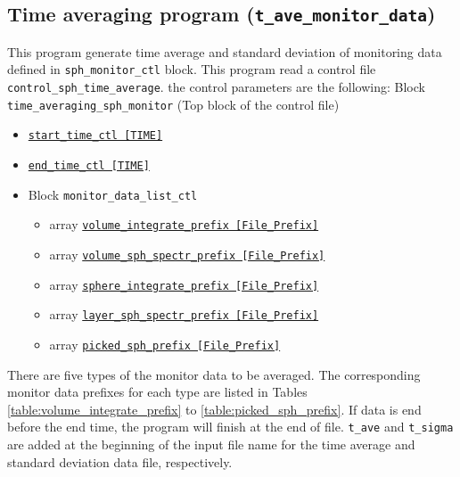 \subsection{Time averaging program  ({\tt t\_ave\_monitor\_data})}
\label{sec:ave_mean_square}
This program generate time average and standard deviation of monitoring data defined in {\tt sph\_monitor\_ctl} block. This program read a control file {\tt control\_sph\_time\_average}. the control parameters are the following:
%
Block \verb|time_averaging_sph_monitor|  (Top block of the control file)
\label{href_i:time_averaging_sph_monitor}
%
\begin{itemize}
\item \hyperref[href_t:tave_start_time_ctl]
		{\tt start\_time\_ctl    [TIME]}
\item \hyperref[href_t:tave_end_time_ctl]
		{\tt end\_time\_ctl      [TIME]}
\item Block {\tt monitor\_data\_list\_ctl}
				\label{href_i:data_files_def}
	\begin{itemize}
	\item array \hyperref[href_t:volume_integrate_prefix]
				{\tt volume\_integrate\_prefix    [File\_Prefix]}
				\label{href_i:volume_integrate_prefix}
	\item array \hyperref[href_t:volume_sph_spectr_prefix]
				{\tt volume\_sph\_spectr\_prefix   [File\_Prefix]}
				\label{href_i:volume_sph_spectr_prefix}
	\item array \hyperref[href_t:sphere_integrate_prefix]
				{\tt sphere\_integrate\_prefix     [File\_Prefix]}
				\label{href_i:sphere_integrate_prefix}
	\item array \hyperref[href_t:layer_sph_spectr_prefix]
				{\tt layer\_sph\_spectr\_prefix    [File\_Prefix]}
				\label{href_i:layer_sph_spectr_prefix}
	\item array \hyperref[href_t:picked_sph_prefix]
				{\tt picked\_sph\_prefix           [File\_Prefix]}
				\label{href_i:picked_sph_prefix}
	\end{itemize}
%
\end{itemize}
%
There are five types of the monitor data to be averaged. The corresponding monitor data prefixes for each type are listed in Tables \ref{table:volume_integrate_prefix} to \ref{table:picked_sph_prefix}. If data is end before the end time, the program will finish at the end of file. \verb|t_ave| and \verb|t_sigma| are added at the beginning of the input file name for the time average and standard deviation data file, respectively.


